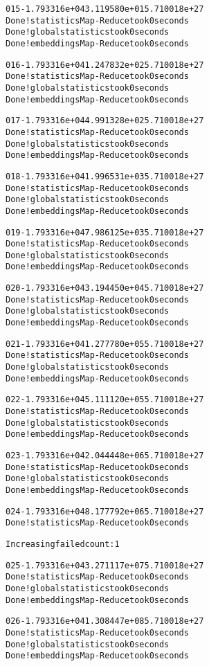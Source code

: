 \documentclass[letterpaper,10pt,english]{/usr/share/sphinx/texinputs/sphinxhowto}
\newenvironment{InvisibleVerbatim}
        {\begin{mdframed}[leftmargin=0.1\linewidth,innerleftmargin=3pt,innerrightmargin=3pt, userdefinedwidth=1\linewidth, linewidth=0pt, linecolor=white, usetwoside=false]}
        {\end{mdframed}}
\begin{document}
\begin{InvisibleVerbatim}
\begin{alltt}
 015  -1.793316e+04   3.119580e+01   5.710018e+27
Done! statistics Map-Reduce took  0  seconds
Done! global statistics took  0  seconds
Done! embeddings Map-Reduce took  0  seconds

 016  -1.793316e+04   1.247832e+02   5.710018e+27
Done! statistics Map-Reduce took  0  seconds
Done! global statistics took  0  seconds
Done! embeddings Map-Reduce took  0  seconds

 017  -1.793316e+04   4.991328e+02   5.710018e+27
Done! statistics Map-Reduce took  0  seconds
Done! global statistics took  0  seconds
Done! embeddings Map-Reduce took  0  seconds

 018  -1.793316e+04   1.996531e+03   5.710018e+27
Done! statistics Map-Reduce took  0  seconds
Done! global statistics took  0  seconds
Done! embeddings Map-Reduce took  0  seconds

 019  -1.793316e+04   7.986125e+03   5.710018e+27
Done! statistics Map-Reduce took  0  seconds
Done! global statistics took  0  seconds
Done! embeddings Map-Reduce took  0  seconds

 020  -1.793316e+04   3.194450e+04   5.710018e+27
Done! statistics Map-Reduce took  0  seconds
Done! global statistics took  0  seconds
Done! embeddings Map-Reduce took  0  seconds

 021  -1.793316e+04   1.277780e+05   5.710018e+27
Done! statistics Map-Reduce took  0  seconds
Done! global statistics took  0  seconds
Done! embeddings Map-Reduce took  0  seconds

 022  -1.793316e+04   5.111120e+05   5.710018e+27
Done! statistics Map-Reduce took  0  seconds
Done! global statistics took  0  seconds
Done! embeddings Map-Reduce took  0  seconds

 023  -1.793316e+04   2.044448e+06   5.710018e+27
Done! statistics Map-Reduce took  0  seconds
Done! global statistics took  0  seconds
Done! embeddings Map-Reduce took  0  seconds

 024  -1.793316e+04   8.177792e+06   5.710018e+27
Done! statistics Map-Reduce took  0  seconds

        Increasing failed count: 1


 025  -1.793316e+04   3.271117e+07   5.710018e+27
Done! statistics Map-Reduce took  0  seconds
Done! global statistics took  0  seconds
Done! embeddings Map-Reduce took  0  seconds

 026  -1.793316e+04   1.308447e+08   5.710018e+27
Done! statistics Map-Reduce took  0  seconds
Done! global statistics took  0  seconds
Done! embeddings Map-Reduce took  0  seconds


\end{alltt}
\end{InvisibleVerbatim}
\end{document}
